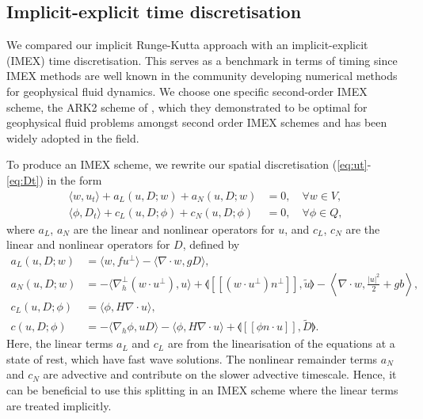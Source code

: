 \documentclass[a4paper, 12pt]{article}
\newcommand{\jump}[1]{[\![#1]\!]}
\begin{document}
\subsection{Implicit-explicit time discretisation}

We compared our implicit Runge-Kutta approach with an
implicit-explicit (IMEX) time discretisation. This serves as a
benchmark in terms of timing since IMEX methods are well known in the
community developing numerical methods for geophysical fluid dynamics.
We choose one specific second-order IMEX scheme, the ARK2 scheme
of \citet{giraldo2013implicit}, which they demonstrated to be optimal
for geophysical fluid problems amongst second order IMEX schemes and has
been widely adopted in the field.

To produce an IMEX scheme, we rewrite our spatial discretisation
(\ref{eq:ut}-\ref{eq:Dt}) in the form
\begin{align}
  \label{eq:ut IMEX}
  \langle w, u_t \rangle + a_L(u,D;w) 
  + a_N(u,D;w) 
   & = 0,
  \quad \forall w \in V, \\
  \label{eq:Dt IMEX}
  \langle \phi, D_t \rangle
+ c_L(u,D; \phi) + c_N(u,D; \phi)  & =
 0, \quad \forall \phi \in Q,
\end{align}
where $a_L$, $a_N$ are the linear and nonlinear operators for $u$,
and $c_L$, $c_N$ are the linear and nonlinear operators for $D$,
defined by
\begin{align}
  a_L(u,D;w) & = \langle w, fu^\perp \rangle - \langle \nabla\cdot w,
  gD \rangle, \\
   a_N(u,D;w) 
&=
  - \langle \nabla_h^\perp (w\cdot u^\perp), u \rangle
  + \llangle \jump{(w\cdot u^\perp) n^\perp}, \tilde{u} \rrangle  - \left\langle \nabla\cdot w, \frac{|u|^2}{2} + gb \right\rangle, \\
  c_L(u,D;\phi) & = \langle \phi, H\nabla\cdot u\rangle, \\
  c(u,D; \phi) &=
  - \langle \nabla_h \phi, uD \rangle
  - \langle \phi, H\nabla\cdot u\rangle
  + \llangle \jump{\phi n\cdot u}, \tilde{D} \rrangle.
\end{align}
Here, the linear terms $a_L$ and $c_L$ are from the linearisation of
the equations at a state of rest, which have fast wave solutions.
The nonlinear remainder terms $a_N$ and $c_N$ are advective and contribute
on the slower advective timescale. Hence, it can be beneficial to use this
splitting in an IMEX scheme where the linear terms are treated implicitly.
\end{document}
